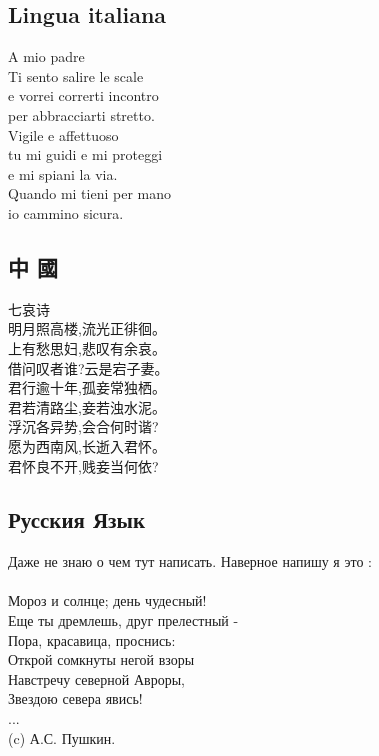 \documentclass{scrartcl}
\begin{document}
\begin{otherlanguage}{italian}
	\section*{Lingua italiana} 
	A mio padre \\
	Ti sento salire le scale \\ 
	e vorrei correrti incontro \\
	per abbracciarti stretto. \\
	Vigile e affettuoso \\
	tu mi guidi e mi proteggi \\
	e mi spiani la via. \\ 
	Quando mi tieni per mano \\
	io cammino sicura. \\
\end{otherlanguage}
\newpage
\begin{CJK}{UTF8}{min}
	\section*{中 國}
	七哀诗 \\
	明月照高楼,流光正徘徊。\\
	上有愁思妇,悲叹有余哀。\\
	借问叹者谁?云是宕子妻。\\
	君行逾十年,孤妾常独栖。\\
	君若清路尘,妾若浊水泥。\\
	浮沉各异势,会合何时谐?  \\
	愿为西南风,长逝入君怀。\\
	君怀良不开,贱妾当何依?  \\
\end{CJK}


\begin{otherlanguage}{russian}
	\section*{Русския Язык}
	Даже не знаю о чем тут написать. Наверное напишу я это : \\
	\\
	Мороз и солнце; день чудесный!\\
	Еще ты дремлешь, друг прелестный - \\
	Пора, красавица, проснись: \\
	Открой сомкнуты негой взоры \\
	Навстречу северной Авроры, \\
	Звездою севера явись!  \\
	... \\ (c) А.С. Пушкин. \\
\end{otherlanguage}
\end{document}
